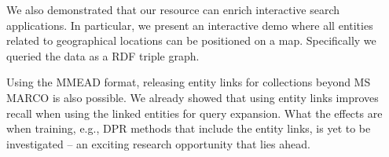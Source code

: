 We also demonstrated that our resource can enrich interactive search applications. In particular, we present an interactive demo where all entities related to geographical locations can be positioned on a map. Specifically we queried the data as a RDF triple graph.

Using the MMEAD format, releasing entity links for collections beyond MS MARCO is also possible. We already showed that using entity links improves recall when using the linked entities for query expansion. What the effects are when training, e.g., DPR methods that include the entity links, is yet to be investigated -- an exciting research opportunity that lies ahead. 
